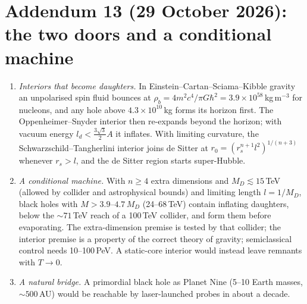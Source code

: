 \documentclass[11pt,a4paper]{article}
\theoremstyle{remark}\newtheorem{remark}[theorem]{Remark}
\begin{document}
\section*{Addendum 13 (29 October 2026): the two doors and a conditional machine}
\begin{enumerate}
\item \emph{Interiors that become daughters.} In Einstein--Cartan--Sciama--Kibble gravity an unpolarised spin fluid bounces at
$\rho_b=4m^2c^4/\pi G\hbar^2=3.9\times10^{58}$\,kg\,m$^{-3}$ for nucleons, and any hole above $4.3\times10^{10}$\,kg forms its horizon first. The
Oppenheimer--Snyder interior then re-expands beyond the horizon; with vacuum energy $l_d<\tfrac{3\sqrt3}{2}A$ it inflates. With limiting curvature, the
Schwarzschild--Tangherlini interior joins de Sitter at $r_0=(r_s^{n+1}l^2)^{1/(n+3)}$ whenever $r_s>l$, and the de Sitter region starts super-Hubble.
\item \emph{A conditional machine.} With $n\ge4$ extra dimensions and $M_D\lesssim15$\,TeV (allowed by collider and astrophysical bounds) and
limiting length $l=1/M_D$, black holes with $M>3.9$--$4.7\,M_D$ (24--68\,TeV) contain inflating daughters, below the $\sim71$\,TeV reach of a
100\,TeV collider, and form them before evaporating. The extra-dimension premise is tested by that collider; the interior premise is a property of the
correct theory of gravity; semiclassical control needs 10--100\,PeV. A static-core interior would instead leave remnants with $T\to0$.
\item \emph{A natural bridge.} A primordial black hole as Planet Nine (5--10 Earth masses, $\sim500$\,AU) would be reachable by laser-launched probes in
about a decade.
\end{enumerate}
\end{document}
